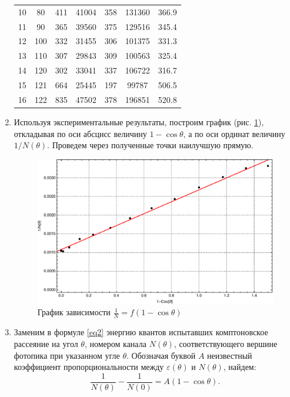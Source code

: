 \documentclass[a4paper, 12pt]{article}
\begin{document}
\begin{enumerate}
\begin{table}[!htb]
\begin{tabular}{|c|c|c|c|c|c|c|}
 			10 & 80 & 411 & 41004 & 358 & 131360 & 366.9 \\
 			11 & 90 & 365 & 39560 & 375 & 129516 & 345.4 \\
 			12 & 100 & 332 & 31455 & 306 & 101375 & 331.3 \\
 			13 & 110 & 307 & 29843 & 309 & 100563 & 325.4 \\
 			14 & 120 & 302 & 33041 & 337 & 106722 & 316.7 \\
 			15 & 121 & 664 & 25445 & 197 & 99787 & 506.5 \\
 			16 & 122 & 835 & 47502 & 378 & 196851 & 520.8 \\
 			\hline
		\end{tabular}
	\end{table}
	\item Используя экспериментальные результаты, построим график (рис. \ref{fig:graph}), откладывая по оси абсцисс величину $1-\cos\theta$, а по оси ординат величину $1/N(\theta)$. Проведем через полученные точки наилучшую прямую.
	\begin{figure}[!htb]
		\includegraphics[width=\textwidth]{graph.pdf}
		\caption{График зависимости $\frac{1}{N}=f\left(1-\cos\theta\right)$}
		\label{fig:graph}
	\end{figure}
	\item Заменим в формуле \ref{eq2} энергию квантов испытавших комптоновское рассеяние на угол $\theta$, номером канала $N(\theta)$, соответствующего вершине фотопика при указанном угле $\theta$. Обозначая буквой $A$ неизвестный коэффициент пропорциональности между $\varepsilon(\theta)$ и $N(\theta)$, найдем:
	\begin{equation}
		\frac{1}{N(\theta)}-\frac{1}{N(0)}=A(1-\cos\theta).
		\label{eq:3}
	\end{equation}

\end{enumerate}
\end{document}
